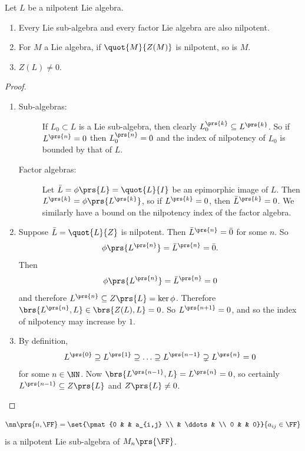 \documentclass[10pt,a4paper,twoside,openany,hidelinks]{book}
\begin{document}
\begin{proposition}
Let $L$ be a nilpotent Lie algebra.
\begin{enumerate}
\item Every Lie sub-algebra and every factor Lie algebra are also nilpotent.
\item For $M$ a Lie algebra, if $\quot{M}{Z(M)}$ is nilpotent, so is $M$.
\item $Z(L) \neq 0$.
\end{enumerate}
\end{proposition}
\begin{proof}
\begin{enumerate}
\item
\begin{description}
\item[Sub-algebras:]
If $L_0 \subset L$ is a Lie sub-algebra, then clearly $L_0^{\prs{k}} \subseteq L^{\prs{k}}$. So if $L^{\prs{n}} = 0$ then $L_0^{\prs{n}} = 0$ and the index of nilpotency of $L_0$ is bounded by that of $L$.
\item[Factor algebras:]
Let $\bar{L} = \phi\prs{L} = \quot{L}{I}$ be an epimorphic image of $L$. Then $L^{\prs{k}} = \phi\prs{L^{\prs{k}}}$, so if $L^{\prs{k}} = 0$, then $\bar{L}^{\prs{k}} = 0$. We similarly have a bound on the nilpotency index of the factor algebra.
\end{description}
\item Suppose $\bar{L} = \quot{L}{Z}$ is nilpotent. Then $\bar{L}^{\prs{n}} = \bar{0}$ for some $n$. So \[\phi\prs{L^{\prs{n}}} = \bar{L}^{\prs{n}} = \bar{0}\text{.}\] Then \[\phi\prs{L^{\prs{n}}} = \bar{L}^{\prs{n}} = 0\] and therefore $L^{\prs{n}} \subseteq Z\prs{L} = \ker \phi$. Therefore $\brs{L^{\prs{n}},L} \in \brs{Z(L),L} = 0$. So $L^{\prs{n+1}} = 0$, and so the index of nilpotency may increase by $1$.
\item By definition, \[L^{\prs{0}} \supseteq L^{\prs{1}} \supseteq \ldots \supseteq L^{\prs{n-1}} \supsetneq L^{\prs{n}} = 0\]
for some $n \in \NN$. Now $\brs{L^{\prs{n-1}}, L} = L^{\prs{n}} = 0$, so certainly $L^{\prs{n-1}} \subseteq Z\prs{L}$ and $Z\prs{L} \neq 0$.
\end{enumerate}
\end{proof}
\begin{exercise}
\[\nn\prs{n,\FF} = \set{\pmat{0 & & a_{i,j} \\ & \ddots & \\ 0 & & 0}}{a_{ij} \in \FF}\] is a nilpotent Lie sub-algebra of $M_n\prs{\FF}$.
\end{exercise}
\end{document}
